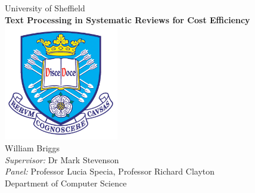 \documentclass[11pt,oneside]{book}
\begin{document}
\begin{titlepage}


\begin{center}
{\LARGE University of Sheffield}\\[1.5cm]
\linespread{1.2}\huge {\bfseries Text Processing in Systematic Reviews for Cost Efficiency}\\[1.5cm]
\linespread{1}
\includegraphics[width=5cm]{images/tuoslogo.png}\\[1cm]
{\Large William Briggs}\\[1cm]
{\large \emph{Supervisor:} Dr Mark Stevenson}\\[1cm]

{\large \emph{Panel:} Professor Lucia Specia, Professor Richard Clayton}\\[1cm]
Department of Computer Science\\[1cm]

\end{center}

\end{titlepage}







\tableofcontents
\listoffigures
\listoftables


\mainmatter


 
  
 
 
 
 
% 
%
% 
 
 

\begin{appendices}



\end{appendices}
\end{document}
